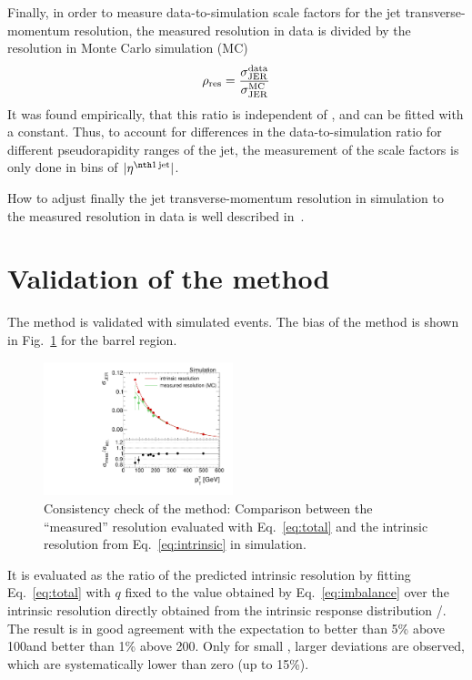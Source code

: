 Finally, in order to measure data-to-simulation scale factors \rhores for the jet transverse-momentum resolution, the measured resolution in data is divided by the resolution in Monte Carlo simulation (MC)
\begin{equation}
\label{res:eq:rhores}
\rho_\mathrm{res} = \frac{\sigma_\mathrm{JER}^{\text{data}}}{\sigma_\mathrm{JER}^{\text{MC}}}
\end{equation}
It was found empirically, that this ratio is independent of \ptgamma, and can be fitted with a constant.
Thus, to account for differences in the data-to-simulation ratio for different pseudorapidity ranges of the jet, the measurement of the scale factors is only done in bins of $|\etafirstjet|$.

How to adjust finally the jet transverse-momentum resolution in simulation to the measured resolution in data is well described in~\cite{bib:Matthias_Thesis}.


\FloatBarrier
\section{Validation of the method}
The method is validated with simulated events. 
The bias of the method is shown in Fig.~\ref{fig:MCClosure} for the barrel region. 
\begin{figure}[t]
  \centering
    \includegraphics[width=0.49\textwidth]{figures/resolution/methodology/MCClosure_for_1_eta_bin_RMS99.pdf}
  \caption{Consistency check of the method: Comparison between the ``measured'' resolution evaluated with Eq.~\eqref{eq:total} and the intrinsic resolution from Eq.~\eqref{eq:intrinsic} in simulation.}  
  \label{fig:MCClosure}
\end{figure}
It is evaluated as the ratio of the predicted intrinsic resolution by fitting Eq.~\eqref{eq:total} with $q$ fixed to the value obtained by Eq.~\eqref{eq:imbalance} over the intrinsic resolution directly obtained from the intrinsic response distribution \ptrecojet/\ptgenjet.
The result is in good agreement with the expectation to better than 5\% above 100\gev and better than 1\% above 200\gev.
Only for small \pt, larger deviations are observed, which are systematically lower than zero (up to 15\%).

